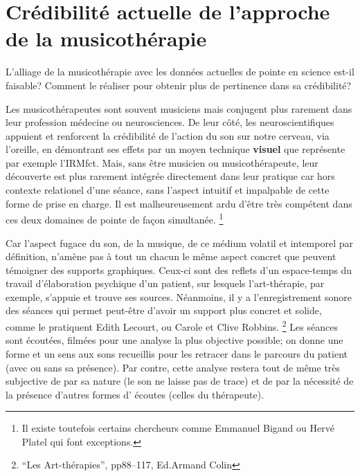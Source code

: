 

 
\section{Crédibilité actuelle de l'approche de la musicothérapie }


L'alliage de la musicothérapie avec les données actuelles de pointe en
science est-il faisable? Comment le réaliser pour obtenir plus de pertinence
dans sa crédibilité?

 
Les musicothérapeutes sont souvent musiciens mais conjugent plus
rarement dans leur profession
médecine ou neurosciences. De leur côté, les neuroscientifiques appuient
et renforcent la crédibilité de l'action du son sur notre cerveau, via
l'oreille, en démontrant ses effets par un moyen technique
\textbf{visuel} que représente par exemple l'IRMfct. Mais, sans être musicien ou
musicothérapeute, leur découverte est plus rarement intégrée
directement dans leur pratique car hors contexte relationel d'une
séance, sans l'aspect intuitif et impalpable de cette forme de prise
en charge.
Il est malheureusement ardu d'être très compétent dans ces deux domaines
de pointe de façon simultanée.   \footnote  {Il existe toutefois certains chercheurs
comme Emmanuel Bigand ou Hervé Platel qui font exceptions.}

Car l'aspect fugace du son, de la musique, de ce médium volatil et
intemporel par
définition, n'amène pas à tout un chacun le
même aspect concret que peuvent témoigner des supports
graphiques. Ceux-ci sont des 
reflets d'un espace-temps du travail d'élaboration
psychique d'un patient, sur lesquels l'art-thérapie, par exemple, s'appuie et trouve
ses sources.
Néanmoins, il y a l'enregistrement sonore des séances qui 
permet peut-être d'avoir un support plus concret et solide, comme le pratiquent Edith Lecourt, ou Carole et Clive 
Robbins. \footnote{``Les Art-thérapies'', pp88--117, Ed.Armand Colin}
Les séances sont écoutées, filmées pour une
analyse la plus objective possible; on donne 
une forme et un sens aux sons recueillis pour les retracer dans le
parcours du patient (avec ou sans sa présence). Par contre, cette analyse  restera
tout de même très subjective de par sa nature (le son ne laisse pas
de trace) et de par la nécessité de la présence d'autres formes d'
écoutes (celles du thérapeute).

